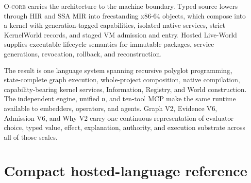 \documentclass[11pt,oneside]{article}
\newcommand{\ocore}{\textsc{O-core}}
\begin{document}
\ocore{} carries the architecture to the machine boundary. Typed source lowers
through HIR and SSA MIR into freestanding x86-64 objects, which compose into a
kernel with generation-tagged capabilities, isolated native services, strict
KernelWorld records, and staged VM admission and entry. Hosted Live-World
supplies executable lifecycle semantics for immutable packages, service
generations, revocation, rollback, and reconstruction.

The result is one language system spanning recursive polyglot programming,
state-complete graph execution, whole-project composition, native compilation,
capability-bearing kernel services, Information, Registry, and World
construction. The independent engine, unified \texttt{o}, and ten-tool MCP
make the same runtime available to embedders, operators, and agents. Graph V2,
Evidence V6, Admission V6, and Why V2 carry one continuous representation of
evaluator choice, typed value, effect, explanation, authority, and execution
substrate across all of those scales.

\appendix

\section{Compact hosted-language reference}
\end{document}
